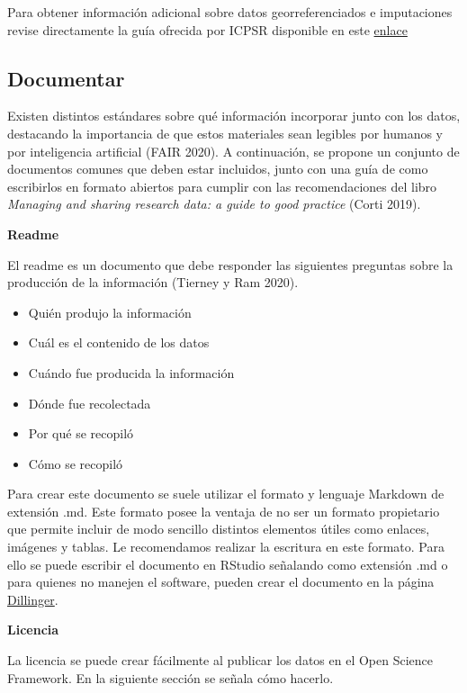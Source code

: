 \documentclass[
  spanish,
  letterpaper,
  DIV=11,
  numbers=noendperiod]{scrreprt}
\begin{document}
Para obtener información adicional sobre datos georreferenciados e
imputaciones revise directamente la guía ofrecida por ICPSR disponible
en este
\href{https://www.icpsr.umich.edu/files/deposit/dataprep.pdf}{enlace}

\subsection{\texorpdfstring{\textbf{Documentar}}{Documentar}}\label{documentar}

Existen distintos estándares sobre qué información incorporar junto con
los datos, destacando la importancia de que estos materiales sean
legibles por humanos y por inteligencia artificial (FAIR 2020). A
continuación, se propone un conjunto de documentos comunes que deben
estar incluidos, junto con una guía de como escribirlos en formato
abiertos para cumplir con las recomendaciones del libro \emph{Managing
and sharing research data: a guide to good practice} (Corti 2019).

\textbf{Readme}

El readme es un documento que debe responder las siguientes preguntas
sobre la producción de la información (Tierney y Ram 2020).

\begin{itemize}
\item
  Quién produjo la información
\item
  Cuál es el contenido de los datos
\item
  Cuándo fue producida la información
\item
  Dónde fue recolectada
\item
  Por qué se recopiló
\item
  Cómo se recopiló
\end{itemize}

Para crear este documento se suele utilizar el formato y lenguaje
Markdown de extensión .md. Este formato posee la ventaja de no ser un
formato propietario que permite incluir de modo sencillo distintos
elementos útiles como enlaces, imágenes y tablas. Le recomendamos
realizar la escritura en este formato. Para ello se puede escribir el
documento en RStudio señalando como extensión .md o para quienes no
manejen el software, pueden crear el documento en la página
\href{https://dillinger.io/}{Dillinger}.

\textbf{Licencia}

La licencia se puede crear fácilmente al publicar los datos en el Open
Science Framework. En la siguiente sección se señala cómo hacerlo.
\end{document}
